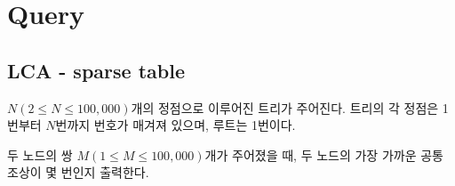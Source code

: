 \documentclass[10pt,landscape,a4paper,twocolumn]{article}
\begin{document}
%
%
%
%
%
%
%
%
%
%
%
%
%
%
%
\section{Query}
\subsection{LCA - sparse table}
$ N(2 \leq N \leq 100,000) $개의 정점으로 이루어진 트리가 주어진다. 트리의 각 정점은 1번부터 $ N $번까지 번호가 매겨져 있으며, 루트는 1번이다.

두 노드의 쌍 $ M(1 \leq M \leq 100,000) $개가 주어졌을 때, 두 노드의 가장 가까운 공통 조상이 몇 번인지 출력한다.
\end{document}
